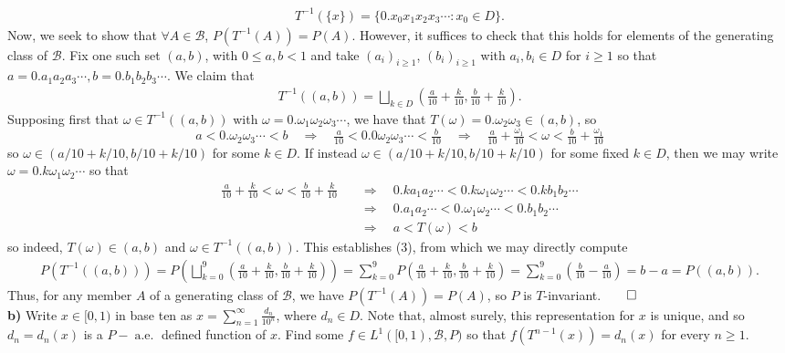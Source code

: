 \documentclass[10pt]{article}
\newcommand{\bp}[1]{\left({#1}\right)}
\newcommand{\1}[1]{\mathbbm{1}_{#1}}
\newcommand{\mc}[1]{\mathcal{#1}}
\DeclareMathOperator{\ale}{a.e.}
\begin{document}
    \begin{align*}
        T^{-1}(\{x\})=\{0.x_0x_1x_2x_3\cdots:x_0\in D\}.
    \end{align*}
    Now, we seek to show that $\forall A\in\mc{B}$, $P(T^{-1}(A))=P(A)$. However, it suffices to check that this holds for elements of the generating class of $\mc{B}$. Fix one such set $(a,b)$, with $0\leq a,b<1$ and take $(a_i)_{i\geq 1}$, $(b_i)_{i\geq 1}$ with $a_i,b_i\in D$ for $i\geq 1$ so that $a=0.a_1a_2a_3\cdots,b=0.b_1b_2b_3\cdots$. We claim that
    \begin{align*}
        T^{-1}((a,b))=\bigsqcup_{k\in D}\left(\tfrac{a}{10}+\tfrac{k}{10},\tfrac{b}{10}+\tfrac{k}{10}\right).\tag{3}
    \end{align*}
    Supposing first that $\omega\in T^{-1}((a,b))$ with $\omega=0.\omega_1\omega_2\omega_3\cdots$, we have that $T(\omega)=0.\omega_2\omega_3\in(a,b)$, so
    \[a<0.\omega_2\omega_3\cdots<b\quad\Rightarrow\quad\tfrac{a}{10}<0.0\omega_2\omega_3\cdots <\tfrac{b}{10}\quad\Rightarrow\quad \tfrac{a}{10}+\tfrac{\omega_1}{10}<\omega<\tfrac{b}{10}+\tfrac{\omega_1}{10}\]
    so $\omega\in(a/10+k/10,b/10+k/10)$ for some $k\in D$. If instead $\omega\in (a/10+k/10,b/10+k/10)$ for some fixed $k\in D$, then we may write $\omega=0.k\omega_1\omega_2\cdots$ so that
    \begin{align*}
        \tfrac{a}{10}+\tfrac{k}{10}<\omega<\tfrac{b}{10}+\tfrac{k}{10}\quad&\Rightarrow\quad 0.ka_1a_2\cdots <0.k\omega_1\omega_2\cdots <0.kb_1b_2\cdots\\
        &\Rightarrow\quad 0.a_1a_2\cdots <0.\omega_1\omega_2\cdots < 0.b_1b_2\cdots\\
        &\Rightarrow\quad a<T(\omega)<b
    \end{align*}
    so indeed, $T(\omega)\in(a,b)$ and $\omega\in T^{-1}((a,b))$. This establishes (3), from which we may directly compute
    \begin{align*}
        P(T^{-1}((a,b)))=P\bp{\bigsqcup_{k=0}^9\bp{\tfrac{a}{10}+\tfrac{k}{10},\tfrac{b}{10}+\tfrac{k}{10}}}=\sum_{k=0}^9P\bp{\tfrac{a}{10}+\tfrac{k}{10},\tfrac{b}{10}+\tfrac{k}{10}}=\sum_{k=0}^9\bp{\tfrac{b}{10}-\tfrac{a}{10}}=b-a=P((a,b)).
    \end{align*}
    Thus, for any member $A$ of a generating class of $\mc{B}$, we have $P(T^{-1}(A))=P(A)$, so $P$ is $T$-invariant.\hfill{$\qed$}\\[5pt]
    {\bf b)} Write $x\in[0,1)$ in base ten as $x=\sum_{n=1}^\infty\tfrac{d_n}{10^n}$, where $d_n\in D$. Note that, almost surely, this representation for $x$ is unique, and so $d_n=d_n(x)$ is a $P-\ale$ defined function of $x$. Find some $f\in L^{1}([0,1),\mc{B},P)$ so that $f(T^{n-1}(x))=d_n(x)$ for every $n\geq 1$.\\[5pt]
\end{document}
